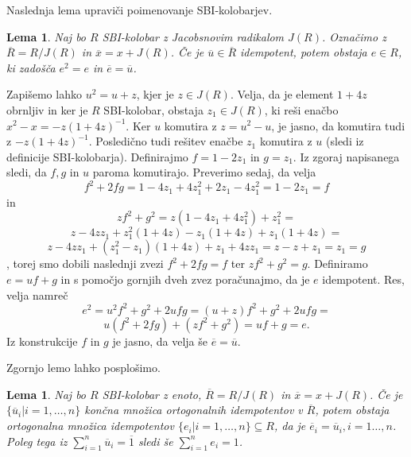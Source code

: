 \documentclass[a4paper, 12pt]{amsart}
\theoremstyle{definition} %
\theoremstyle{plain} %
\newtheorem{lema}[definicija]{Lema}
\begin{document}
Naslednja lema upraviči poimenovanje SBI-kolobarjev.

\begin{lema}
\label{SBIEnIdem}
Naj bo $R$ SBI-kolobar z Jacobsnovim radikalom $J(R)$. Označimo z $\overline{R} = R/J(R)$ in $\overline{x} = x + J(R)$. Če je $\overline{u} \in \overline{R}$ idempotent, potem obstaja $e\in R$, ki zadošča $e^2 = e$ in $\overline{e} = \overline{u}$.
\end{lema}

\proof
Zapišemo lahko $u^2 = u+z$, kjer je $z\in J(R)$. Velja, da je element $1+4z$ obrnljiv in ker je $R$ SBI-kolobar, obstaja $z_1\in  J(R)$, ki reši enačbo $x^2 - x = -z(1+4z)^{-1}$. Ker $u$ komutira z $z=u^2 - u$, je jasno, da komutira tudi z $-z(1+4z)^{-1}$. Posledično tudi rešitev enačbe $z_1$ komutira z $u$ (sledi iz definicije SBI-kolobarja). Definirajmo $f=1-2z_1$ in $g=z_1$. Iz zgoraj napisanega sledi, da $f,g$ in $u$ paroma komutirajo. Preverimo sedaj, da velja
$$
f^2 +2fg = 1-4z_1 + 4 z_1^2 + 2z_1 - 4z_1^2 = 1 - 2z_1 = f
$$  
in
$$
zf^2 + g^2 = z(1-4z_1 + 4z_1^2) + z_1^2 =
$$
$$
z- 4zz_1 + z_1^2(1+4z) - z_1(1+4z) + z_1(1+4z) =
$$
$$
z - 4zz_1 + (z_1^2 - z_1)(1+4z) + z_1 +4zz_1 = z-z+z_1=z_1=g
$$,
torej smo dobili naslednji zvezi $f^2 + 2fg = f$ ter $zf^2 + g^2 = g$. Definiramo $e = uf +g$ in s pomočjo gornjih dveh zvez poračunajmo, da je $e$ idempotent. Res, velja namreč
$$
e^2 = u^2 f^2 + g^2 + 2ufg = (u+z)f^2 + g^2 + 2ufg = 
$$
$$
u(f^2 +2fg) + (zf^2 +g^2) = uf +g = e.
$$
Iz konstrukcije $f$ in $g$ je jasno, da velja še $\overline{e} = \overline{u}$.
\endproof

Zgornjo lemo lahko posplošimo.

\begin{lema}
\label{SBInIdem}
Naj bo $R$ SBI-kolobar z enoto, $\overline{R} = R/J(R)$ in $\overline{x} = x + J(R)$. Če je $\{\overline{u}_i|i=1,\dots,n\}$ končna množica ortogonalnih idempotentov v $\overline{R}$, potem obstaja ortogonalna množica idempotentov $\{e_i|i=1,\dots,n\} \subseteq R$, da je $\overline{e}_i = \overline{u}_i, i =1\dots,n$. Poleg tega iz $\sum_{i=1}^n \overline{u}_i = \overline{1}$ sledi še $\sum_{i=1}^n e_i =1$. 
\end{lema}
\end{document}
